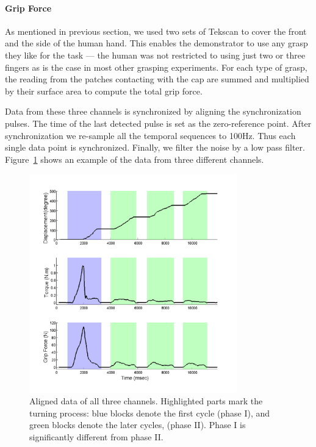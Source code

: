 \paragraph{\textbf{Grip Force}}
\label{tekscan}
As mentioned in previous section, we used two sets of Tekscan to cover
the front and the side of the human hand. This enables the
demonstrator to use any grasp they like for the task --- the human was
not restricted to using just two or three fingers as is the case in
most other grasping experiments. For each type of grasp, the reading
from the patches contacting with the cap are summed and multiplied by
their surface area to compute the total grip force. %


Data from these three channels is synchronized by aligning the
synchronization pulses. The time of the last detected pulse is set as
the zero-reference point. After synchronization we re-sample all the
temporal sequences to 100Hz. Thus each single data point is
synchronized. Finally, we filter the noise by a low pass
filter. Figure~\ref{fig:3channels} shows an example of the data from
three different channels.



\begin{figure}
  \centering
  \hspace{-0.5cm}
  \includegraphics[width=9cm]{./fig/b3c2_1_sTF.pdf}
  \vspace{-0.5cm}
  \caption{ \scriptsize{Aligned data of all three
      channels. Highlighted parts mark the turning process: blue
      blocks denote the first cycle (phase I), and green
      blocks denote the later cycles, (phase II). Phase I is
      significantly different from phase II.}
}
\label{fig:3channels}
\end{figure}


